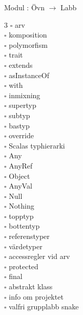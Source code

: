 
    Modul : Övn  $\rightarrow$ Labb 
    \begin{multicols}{3}\SlideFontTiny
    $\square$ arv \\
$\square$ komposition \\
$\square$ polymorfism \\
$\square$ trait \\
$\square$ extends \\
$\square$ asInstanceOf \\
$\square$ with \\
$\square$ inmixning \\
$\square$ supertyp \\
$\square$ subtyp \\
$\square$ bastyp \\
$\square$ override \\
$\square$ Scalas typhierarki \\
$\square$ Any \\
$\square$ AnyRef \\
$\square$ Object \\
$\square$ AnyVal \\
$\square$ Null \\
$\square$ Nothing \\
$\square$ topptyp \\
$\square$ bottentyp \\
$\square$ referenstyper \\
$\square$ värdetyper \\
$\square$ accessregler vid arv \\
$\square$ protected \\
$\square$ final \\
$\square$ abstrakt klass \\
$\square$ info om projektet \\
$\square$ valfri grupplabb snake \\
    \end{multicols}
    